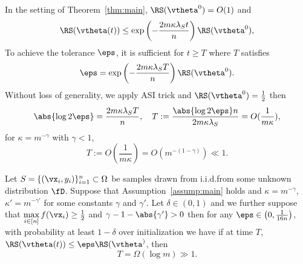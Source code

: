 \documentclass{article}
\begin{document}
\begin{rmk}
    In the setting of Theorem~\ref{thm:main}, $\RS(\vtheta^0)=O(1)$ and
    \begin{equation}
        \RS(\vtheta(t))\leq\exp\left(-\frac{2m\kappa\lambda_S t}{n}\right)\RS(\vtheta^0),
    \end{equation}
    To achieve the tolerance $\eps$, it is sufficient for $t\geq T$ where $T$ satisfies
    \begin{equation}
        \eps=\exp\left(-\frac{2m\kappa\lambda_S T}{n}\right)\RS(\vtheta^0).
    \end{equation}
    Without loss of generality, we apply ASI trick and $\RS(\vtheta^0)=\frac{1}{2}$ then
    \begin{equation}
        \abs{\log 2\eps}=\frac{2m\kappa\lambda_S T}{n}, \quad T:=\frac{\abs{\log 2\eps}n}{2m\kappa\lambda_S}=O(\frac{1}{m\kappa}),
    \end{equation}
    for $\kappa=m^{-\gamma}$ with $\gamma<1$,
    \begin{equation}
        T:=O(\frac{1}{m\kappa})=O(m^{-(1-\gamma)})\ll 1.
    \end{equation}
\end{rmk}
\begin{thm}
    Let $S=\{(\vx_i,y_i)\}^n_{i=1}\subset\Omega$ be samples drawn from i.i.d.from some unknown distribution $\fD$. Suppose that Assumption~\ref{assump:main} holds and $\kappa=m^{-\gamma}$, $\kappa'=m^{-\gamma'}$ for some constants $\gamma$ and $\gamma'$. Let $\delta\in(0,1)$ and we further suppose that $\max\limits_{i\in[n]}f(\vx_i)\geq\frac{1}{2}$ and $\gamma-1-\abs{\gamma'}>0$ then for any $\eps\in\left(0,\frac{1}{16n}\right)$, with probability at least $1-\delta$ over initialization we have if at time $T$, $\RS(\vtheta(t))\leq\eps\RS(\vtheta^)$, then
    \begin{equation}
        T=\Omega(\log m) \gg 1.
    \end{equation}
\end{thm}
\end{document}
